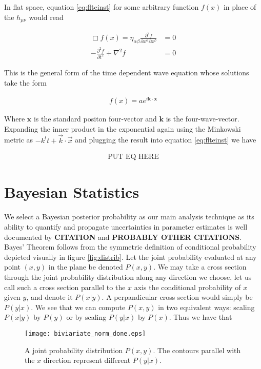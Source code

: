 \documentclass[paper=a4, fontsize=11pt]{scrartcl} %
\numberwithin{equation}{section} %
\numberwithin{figure}{section} %
\numberwithin{table}{section} %
\begin{document}
In flat space, equation \ref{eq:flteinst} for some arbitrary function $f(x)$ in place of the $h_{\mu \nu}$ would read

\begin{align}
\Box f(x) = \eta_{\alpha \beta} \frac{\partial^2 f}{\partial x^{\alpha} \partial x^{\beta}} &= 0\\
-\frac{\partial^2 f}{\partial t^2} + \nabla^2f &= 0
\end{align} 

This is the general form of the time dependent wave equation whose solutions take the form

\begin{align}
f(x) = a e^{i \mathbf{k} \cdot \mathbf{x}}
\end{align}

Where $\mathbf{x}$ is the standard positon four-vector and $\mathbf{k}$ is the four-wave-vector. Expanding the inner product in the exponential again using the Minkowski metric as $-k^t t + \vec{k}\cdot \vec{x}$ and plugging the result into equation \ref{eq:flteinst} we have 

\begin{align}
\text{PUT EQ HERE}
\end{align}




\section{Bayesian Statistics}
We select a Bayesian posterior probability as our main analysis technique as its ability to quantify and propagate uncertainties in parameter estimates is well documented by \textbf{CITATION} and \textbf{PROBABLY OTHER CITATIONS}. Bayes' Theorem follows from the symmetric definition of conditional probability depicted visually in figure \ref{fig:distrib}. Let the joint probability evaluated at any point $(x,y)$ in the plane be denoted $P(x,y)$. We may take a cross section through the joint probability distribution along any direction we choose, let us call such a cross section parallel to the $x$ axis the conditional probability of $x$ given $y$, and denote it $P(x|y)$. A perpandicular cross section would simply be $P(y|x)$. We see that we can compute $P(x,y)$ in two equivalent ways: scaling $P(x|y)$ by $P(y)$ or by scaling $P(y|x)$ by $P(x)$. Thus we have that 


\begin{figure}[h!]
\center
\texttt{[image: biviariate\_norm\_done.eps]}
\caption{A joint probability distribution $P(x,y)$. The contours parallel with the $x$ direction represent different $P(y|x)$.}
\label{fig:sphere}
\end{figure}
\end{document}
